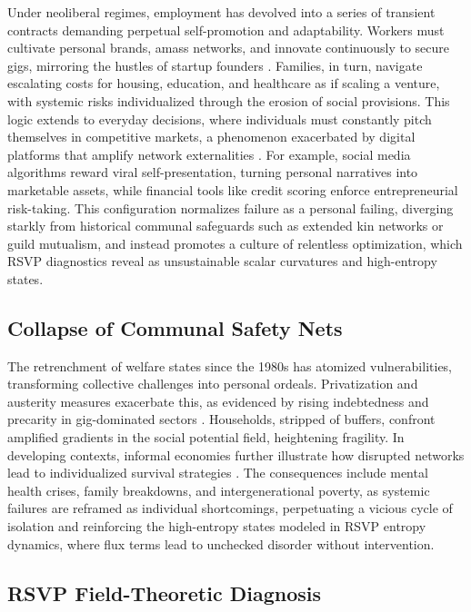 \documentclass[11pt]{article}
\begin{document}
Under neoliberal regimes, employment has devolved into a series of transient contracts demanding perpetual self-promotion and adaptability. Workers must cultivate personal brands, amass networks, and innovate continuously to secure gigs, mirroring the hustles of startup founders \citep{giddens2006sociology}. Families, in turn, navigate escalating costs for housing, education, and healthcare as if scaling a venture, with systemic risks individualized through the erosion of social provisions. This logic extends to everyday decisions, where individuals must constantly pitch themselves in competitive markets, a phenomenon exacerbated by digital platforms that amplify network externalities \citep{katz1985network}. For example, social media algorithms reward viral self-presentation, turning personal narratives into marketable assets, while financial tools like credit scoring enforce entrepreneurial risk-taking. This configuration normalizes failure as a personal failing, diverging starkly from historical communal safeguards such as extended kin networks or guild mutualism, and instead promotes a culture of relentless optimization, which RSVP diagnostics reveal as unsustainable scalar curvatures and high-entropy states.

\subsection{Collapse of Communal Safety Nets}

The retrenchment of welfare states since the 1980s has atomized vulnerabilities, transforming collective challenges into personal ordeals. Privatization and austerity measures exacerbate this, as evidenced by rising indebtedness and precarity in gig-dominated sectors \citep{scott1998seeing}. Households, stripped of buffers, confront amplified gradients in the social potential field, heightening fragility. In developing contexts, informal economies further illustrate how disrupted networks lead to individualized survival strategies \citep{fafchamps2000ethnicity}. The consequences include mental health crises, family breakdowns, and intergenerational poverty, as systemic failures are reframed as individual shortcomings, perpetuating a vicious cycle of isolation and reinforcing the high-entropy states modeled in RSVP entropy dynamics, where flux terms lead to unchecked disorder without intervention.

\subsection{RSVP Field-Theoretic Diagnosis}
\end{document}
